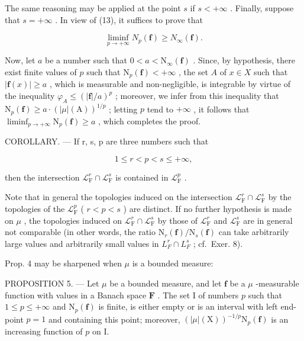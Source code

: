The same reasoning may be applied at the point \(s\) if \(s < +\infty\) . Finally, suppose that \(s = +\infty\) . In view of (13), it suffices to prove that

\[
\liminf _ {p \to + \infty} N _ {p} (\mathbf {f}) \geqslant N _ {\infty} (\mathbf {f}).
\]

Now, let \(a\) be a number such that \(0 < a < \mathrm{N}_{\infty}(\mathbf{f})\) . Since, by hypothesis, there exist finite values of \(p\) such that \(\mathrm{N}_p(\mathbf{f}) < +\infty\) , the set \(A\) of \(x \in X\) such that \(|\mathbf{f}(x)| \geqslant a\) , which is measurable and non-negligible, is integrable by virtue of the inequality \(\varphi_A \leqslant (|\mathbf{f}|/a)^p\) ; moreover, we infer from this inequality that \(\mathrm{N}_p(\mathbf{f}) \geqslant a \cdot (|\mu|(\mathrm{A}))^{1/p}\) ; letting \(p\) tend to \(+\infty\) , it follows that \(\liminf_{p \to +\infty} \mathrm{N}_p(\mathbf{f}) \geqslant a\) , which completes the proof.

COROLLARY. --- If r, s, p are three numbers such that

\[
1 \leqslant r <   p <   s \leqslant + \infty ,
\]

then the intersection \(\mathcal{L}_{\mathrm{F}}^{r} \cap \mathcal{L}_{\mathrm{F}}^{s}\) is contained in \(\mathcal{L}_{\mathrm{F}}^{p}\) .

Note that in general the topologies induced on the intersection \(\mathcal{L}_{\mathrm{F}}^{r} \cap \mathcal{L}_{\mathrm{F}}^{s}\) by the topologies of the \(\mathcal{L}_{\mathrm{F}}^{p}\) ( \(r < p < s\) ) are distinct. If no further hypothesis is made on \(\mu\) , the topologies induced on \(\mathcal{L}_{\mathrm{F}}^{r} \cap \mathcal{L}_{\mathrm{F}}^{s}\) by those of \(\mathcal{L}_{\mathrm{F}}^{r}\) and \(\mathcal{L}_{\mathrm{F}}^{s}\) are in general not comparable (in other words, the ratio \(\mathrm{N}_{r}(\mathbf{f})/\mathrm{N}_{s}(\mathbf{f})\) can take arbitrarily large values and arbitrarily small values in \(L_{F}^{r} \cap L_{F}^{s}\) ; cf.~Exer. 8).

Prop. 4 may be sharpened when \(\mu\) is a bounded measure:

PROPOSITION 5. --- Let \(\mu\) be a bounded measure, and let \(\mathbf{f}\) be a \(\mu\) -measurable function with values in a Banach space \(\mathbf{F}\) . The set I of numbers \(p\) such that \(1 \leqslant p \leqslant +\infty\) and \(\mathrm{N}_p(\mathbf{f})\) is finite, is either empty or is an interval with left end-point \(p = 1\) and containing this point; moreover, \((|\mu|(\mathrm{X}))^{-1/p} \mathrm{N}_p(\mathbf{f})\) is an increasing function of \(p\) on I.

